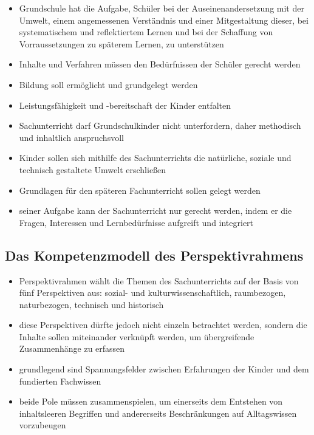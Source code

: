 \newpage


\begin{itemize}

	\item{Grundschule hat die Aufgabe, Schüler bei der 		Auseinenandersetzung mit der Umwelt, einem angemessenen 	Verständnis und einer Mitgestaltung dieser, bei 		systematischem und reflektiertem Lernen und bei 	der Schaffung von Vorraussetzungen zu späterem Lernen, zu 		unterstützen}
	\item{Inhalte und Verfahren müssen den Bedürfnissen der Schüler gerecht werden}
	\item{Bildung soll ermöglicht und grundgelegt werden}
	\item{Leistungsfähigkeit und -bereitschaft der Kinder entfalten}
	\item{Sachunterricht darf Grundschulkinder nicht unterfordern, daher methodisch und inhaltlich anspruchsvoll}
	\item{Kinder sollen sich mithilfe des Sachunterrichts die natürliche, soziale und technisch gestaltete Umwelt erschließen}
	\item{Grundlagen für den späteren Fachunterricht sollen gelegt werden}
	\item{seiner Aufgabe kann der Sachunterricht nur gerecht werden, indem er die Fragen, Interessen und Lernbedürfnisse aufgreift und integriert}

\end{itemize}

\subsection{Das Kompetenzmodell des Perspektivrahmens}

\begin{itemize}

	\item{Perspektivrahmen wählt die Themen des Sachunterrichts auf der Basis von fünf Perspektiven aus: sozial- und kulturwissenschaftlich, raumbezogen, naturbezogen, technisch und historisch}
	\item{diese Perspektiven dürfte jedoch nicht einzeln betrachtet werden, sondern die Inhalte sollen miteinander verknüpft werden, um übergreifende Zusammenhänge zu erfassen}
	\item{grundlegend sind Spannungsfelder zwischen Erfahrungen der Kinder und dem fundierten Fachwissen}
	\item{beide Pole müssen zusammenspielen, um einerseits dem Entstehen von inhaltsleeren Begriffen und andererseits Beschränkungen auf Alltagswissen vorzubeugen}

\end{itemize}


